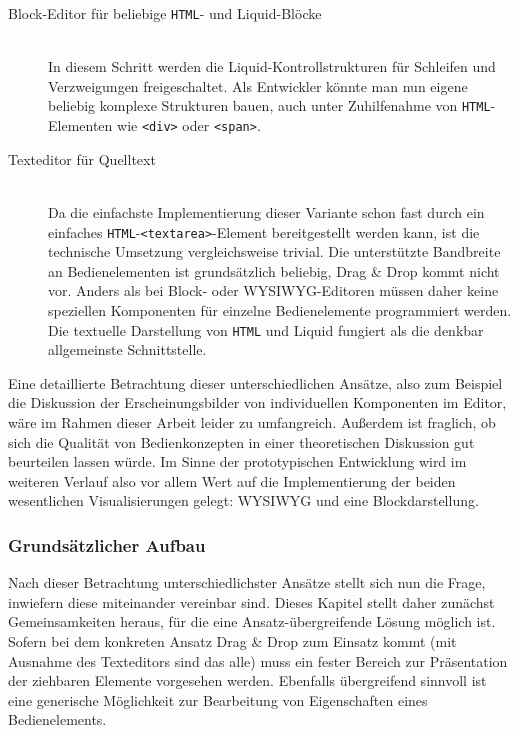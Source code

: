 \begin{description}
\item[ Block-Editor für beliebige \texttt{HTML}- und Liquid-Blöcke] \hfill \\
  In diesem Schritt werden die Liquid-Kontrollstrukturen für Schleifen und Verzweigungen freigeschaltet. Als Entwickler könnte man nun eigene beliebig komplexe Strukturen bauen, auch unter Zuhilfenahme von \texttt{HTML}-Elementen wie \texttt{<div>} oder \texttt{<span>}.
  
\item[ Texteditor für Quelltext] \hfill \\
  Da die einfachste Implementierung dieser Variante schon fast durch ein einfaches \texttt{HTML}-\texttt{<textarea>}-Element bereitgestellt werden kann, ist die technische Umsetzung vergleichsweise trivial. Die unterstützte Bandbreite an Bedienelementen ist grundsätzlich beliebig, Drag \& Drop kommt nicht vor. Anders als bei Block- oder WYSIWYG-Editoren müssen daher keine speziellen Komponenten für einzelne Bedienelemente programmiert werden. Die textuelle Darstellung von \texttt{HTML} und Liquid fungiert als die denkbar allgemeinste Schnittstelle.  
\end{description}

Eine detaillierte Betrachtung dieser unterschiedlichen Ansätze, also zum Beispiel die Diskussion der Erscheinungsbilder von individuellen Komponenten im Editor, wäre im Rahmen dieser Arbeit leider zu umfangreich. Außerdem ist fraglich, ob sich die Qualität von Bedienkonzepten in einer theoretischen Diskussion gut beurteilen lassen würde. Im Sinne der prototypischen Entwicklung wird im weiteren Verlauf also vor allem Wert auf die Implementierung der beiden wesentlichen Visualisierungen gelegt: WYSIWYG und eine Blockdarstellung.

\subsubsection{Grundsätzlicher Aufbau}
\label{sec:design-ui-editor}

Nach dieser Betrachtung unterschiedlichster Ansätze stellt sich nun die Frage, inwiefern diese miteinander vereinbar sind. Dieses Kapitel stellt daher zunächst Gemeinsamkeiten heraus, für die eine Ansatz-übergreifende Lösung möglich ist. Sofern bei dem konkreten Ansatz Drag \& Drop zum Einsatz kommt (mit Ausnahme des Texteditors sind das alle) muss ein fester Bereich zur Präsentation der ziehbaren Elemente vorgesehen werden. Ebenfalls übergreifend sinnvoll ist eine generische Möglichkeit zur Bearbeitung von Eigenschaften eines Bedienelements.

